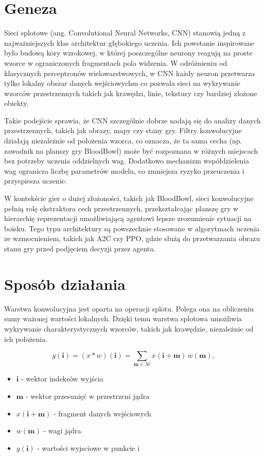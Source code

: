 \section{Geneza}
Sieci splotowe (ang. Convolutional Neural Networks, CNN) stanowią jedną z najważniejszych klas architektur głębokiego uczenia. Ich powstanie inspirowane było budową kory wzrokowej, w której poszczególne neurony reagują na proste wzorce w ograniczonych fragmentach pola widzenia. W odróżnieniu od klasycznych perceptronów wielowarstwowych, w CNN każdy neuron przetwarza tylko lokalny obszar danych wejściowychm co pozwala sieci na wykrywanie wzorców przestrzennych takich jak krawędzi, linie, tekstury czy bardziej złożone obiekty.

Takie podejście sprawia, że CNN szczególnie dobrze nadają się do analizy danych przestrzennych, takich jak obrazy, mapy czy stany gry. Filtry konwolucyjne działają niezależnie od położenia wzorca, co oznacza, że ta sama cecha (np. zawodnik na planszy gry BloodBowl) może być rozpoznana w różnych miejscach bez potrzeby uczenia oddzielnych wag. Dodatkowo mechanizm współdzielenia wag ogranicza liczbę parametrów modelu, co zmniejsza ryzyko przeuczenia i przyspiesza uczenie.

W kontekście gier o dużej złożoności, takich jak BloodBowl, sieci konwolucyjne pełnią rolę ekstraktora cech przestrzennych, przekształcając planszę gry w hierarchię reprezentacji umożliwiającą agentowi lepsze zrozumienie sytuacji na boisku. Tego typu architektury są powszechnie stosowane w algorytmach uczenia ze wzmocnieniem, takich jak A2C czy PPO, gdzie służą do przetwarzania obrazu stanu gry przed podjęciem decyzji przez agenta.
\cite{lecun1998gradient}

\section{Sposób działania}

Warstwa konwolucyjna jest oparta na operacji splotu. Polega ona na obliczeniu sumy ważonej wartości lokalnych. Dzięki temu warstwa splotowa umożliwia wykrywanie charakterystycznych wzorców, takich jak krawędzie, niezależnie od ich położenia.


\[
y(\mathbf{i}) = (x * w)(\mathbf{i}) = 
\sum_{\mathbf{m} \in \mathcal{M}} 
x(\mathbf{i} + \mathbf{m}) \, w(\mathbf{m}),
\]


\begin{itemize}
	\item $\mathbf{i}$ -  wektor indeksów wyjścia
	\item $\mathbf{m}$ - wektor przesunięć w przestrzeni jądra
	\item $x(\mathbf{i} + \mathbf{m})$ - fragment danych wejściowych
	\item $w(\mathbf{m})$ - wagi jądra
	\item $y(\mathbf{i})$ - wartości wyjsciowe w punkcie i
\end{itemize}

